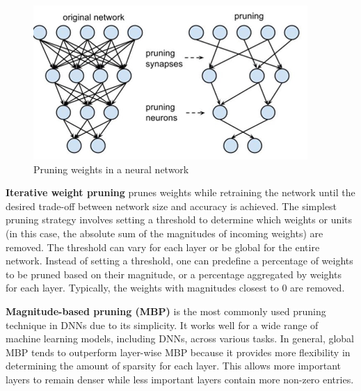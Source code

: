 \begin{figure}[!ht]
    \centering
    \includegraphics[width=0.5\linewidth]{img/ModelCompression/NetworkPruning.png}
    \caption{Pruning weights in a neural network}
    \label{fig:pruning}
\end{figure}

\textbf{Iterative weight pruning} prunes weights while retraining the network
until the desired trade-off between network size and accuracy is achieved. The
simplest pruning strategy involves setting a threshold to determine which weights
or units (in this case, the absolute sum of the magnitudes of incoming weights)
are removed. The threshold can vary for each layer or be global for the entire
network. Instead of setting a threshold, one can predefine a percentage of weights
to be pruned based on their magnitude, or a percentage aggregated by weights for
each layer. Typically, the weights with magnitudes closest to 0 are removed.

\textbf{Magnitude-based pruning (MBP)} is the most commonly used pruning technique
in DNNs due to its simplicity. It works well for a wide range of machine learning
models, including DNNs, across various tasks. In general, global MBP tends to
outperform layer-wise MBP because it provides more flexibility in determining
the amount of sparsity for each layer. This allows more important layers to remain
denser while less important layers contain more non-zero entries.

